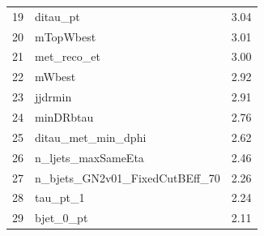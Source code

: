 \begin{table}[h]
\begin{tabular}{c l c}
    19 & ditau\_pt & 3.04 \\
    20 & mTopWbest & 3.01 \\
    21 & met\_reco\_et & 3.00 \\
    22 & mWbest & 2.92 \\
    23 & jjdrmin & 2.91 \\
    24 & minDRbtau & 2.76 \\
    25 & ditau\_met\_min\_dphi & 2.62 \\
    26 & n\_ljets\_maxSameEta & 2.46 \\
    27 & n\_bjets\_GN2v01\_FixedCutBEff\_70 & 2.26 \\
    28 & tau\_pt\_1 & 2.24 \\
    29 & bjet\_0\_pt & 2.11 \\
    \bottomrule
  \end{tabular}
\end{table}


